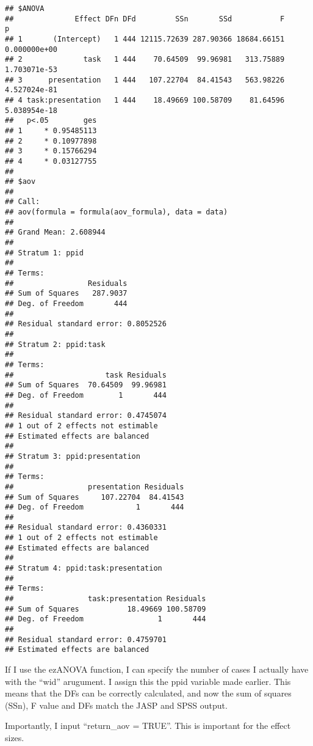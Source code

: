 \documentclass[]{article}
\newenvironment{Shaded}{\begin{snugshade}}{\end{snugshade}}
\newcommand{\KeywordTok}[1]{\textcolor[rgb]{0.13,0.29,0.53}{\textbf{#1}}}
\newcommand{\DataTypeTok}[1]{\textcolor[rgb]{0.13,0.29,0.53}{#1}}
\newcommand{\CommentTok}[1]{\textcolor[rgb]{0.56,0.35,0.01}{\textit{#1}}}
\newcommand{\OtherTok}[1]{\textcolor[rgb]{0.56,0.35,0.01}{#1}}
\newcommand{\OperatorTok}[1]{\textcolor[rgb]{0.81,0.36,0.00}{\textbf{#1}}}
\newcommand{\NormalTok}[1]{#1}
\begin{document}
\begin{verbatim}
## $ANOVA
##              Effect DFn DFd         SSn       SSd           F            p
## 1       (Intercept)   1 444 12115.72639 287.90366 18684.66151 0.000000e+00
## 2              task   1 444    70.64509  99.96981   313.75889 1.703071e-53
## 3      presentation   1 444   107.22704  84.41543   563.98226 4.527024e-81
## 4 task:presentation   1 444    18.49669 100.58709    81.64596 5.038954e-18
##   p<.05        ges
## 1     * 0.95485113
## 2     * 0.10977898
## 3     * 0.15766294
## 4     * 0.03127755
## 
## $aov
## 
## Call:
## aov(formula = formula(aov_formula), data = data)
## 
## Grand Mean: 2.608944
## 
## Stratum 1: ppid
## 
## Terms:
##                 Residuals
## Sum of Squares   287.9037
## Deg. of Freedom       444
## 
## Residual standard error: 0.8052526
## 
## Stratum 2: ppid:task
## 
## Terms:
##                     task Residuals
## Sum of Squares  70.64509  99.96981
## Deg. of Freedom        1       444
## 
## Residual standard error: 0.4745074
## 1 out of 2 effects not estimable
## Estimated effects are balanced
## 
## Stratum 3: ppid:presentation
## 
## Terms:
##                 presentation Residuals
## Sum of Squares     107.22704  84.41543
## Deg. of Freedom            1       444
## 
## Residual standard error: 0.4360331
## 1 out of 2 effects not estimable
## Estimated effects are balanced
## 
## Stratum 4: ppid:task:presentation
## 
## Terms:
##                 task:presentation Residuals
## Sum of Squares           18.49669 100.58709
## Deg. of Freedom                 1       444
## 
## Residual standard error: 0.4759701
## Estimated effects are balanced
\end{verbatim}

If I use the ezANOVA function, I can specify the number of cases I
actually have with the ``wid'' arugument. I assign this the ppid
variable made earlier. This means that the DFs can be correctly
calculated, and now the sum of squares (SSn), F value and DFs match the
JASP and SPSS output.

Importantly, I input ``return\_aov = TRUE''. This is important for the
effect sizes.

\begin{Shaded}
\end{Shaded}
\end{document}
